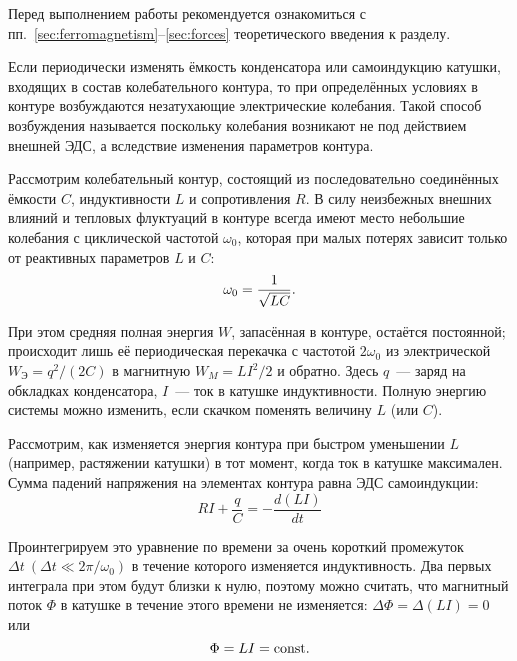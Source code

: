


Перед выполнением работы рекомендуется ознакомиться с
пп.~\ref{sec:ferromagnetism}--\ref{sec:forces} теоретического
введения к разделу.

Если периодически изменять ёмкость конденсатора или самоиндукцию катушки,
входящих в состав колебательного контура, то при определённых условиях в контуре
возбуждаются незатухающие электрические колебания. Такой способ возбуждения
называется  поскольку колебания возникают не под
действием внешней ЭДС, а вследствие изменения параметров контура.

Рассмотрим колебательный контур, состоящий из последовательно соединённых
ёмкости $C$, индуктивности $L$ и сопротивления $R$. В силу неизбежных внешних
влияний и тепловых флуктуаций в контуре всегда имеют место небольшие колебания с
циклической частотой $\omega_0$, которая при малых потерях зависит только от реактивных
параметров $L$ и $C$:
\begin{equation}
	\eqmark{4.6.1}
	 \omega_0 = \frac{1}{\sqrt{LC}}.
\end{equation}

При этом средняя полная энергия $W$, запасённая в контуре, остаётся постоянной;
происходит лишь её периодическая перекачка с частотой $2\omega_0$ из
электрической $W_\text{Э} = q^2 / (2C)$ в магнитную $W_M = LI^2/2$ и обратно.
Здесь $q$~--- заряд на обкладках конденсатора, $I$~--- ток в катушке
индуктивности. Полную энергию системы можно изменить, если скачком поменять
величину $L$ (или $C$).

 Рассмотрим, как изменяется энергия контура при быстром уменьшении $L$
(например, растяжении катушки) в тот момент, когда ток в катушке максимален.
Сумма падений напряжения на элементах контура равна ЭДС самоиндукции:
\begin{equation*}
	RI + \frac{q}{C}= - \frac{d(LI)}{dt}
\end{equation*}

Проинтегрируем это уравнение по времени за очень короткий промежуток $\Delta t
~(\Delta t \ll 2\pi/\omega_0)$ в течение которого изменяется индуктивность. Два
первых интеграла при этом будут близки к нулю, поэтому можно считать, что
магнитный поток $\Phi$ в катушке в течение этого времени не изменяется:
$\Delta \Phi=\Delta (LI) = 0$ или
\begin{equation}
	\eqmark{4.6.2}
	\Phi=LI =\const.
\end{equation}


